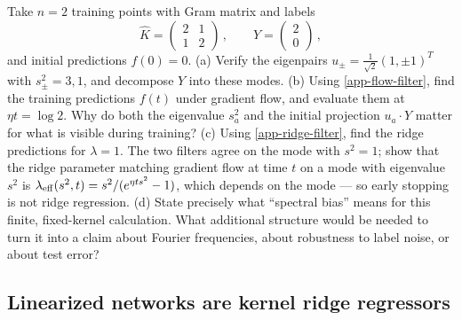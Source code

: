 \documentclass[11pt]{article}
\begin{document}
\begin{exercise}
\label{ex:app-filters}
Take $n=2$ training points with Gram matrix and labels
%
\begin{equation*}
    \hat K = \begin{pmatrix} 2 & 1 \\ 1 & 2\end{pmatrix}\,,\qquad Y = \begin{pmatrix} 2 \\ 0 \end{pmatrix}\,,
\end{equation*}
%
and initial predictions $f(0) = 0$.
(a) Verify the eigenpairs $u_\pm = \frac{1}{\sqrt2}(1,\pm 1)^T$ with $s_\pm^2 = 3, 1$, and decompose $Y$ into these modes.
(b) Using \eqref{app-flow-filter}, find the training predictions $f(t)$ under gradient flow, and evaluate them at $\eta t = \log 2$. Why do both the eigenvalue $s_a^2$ and the initial projection $u_a\cdot Y$ matter for what is visible during training?
(c) Using \eqref{app-ridge-filter}, find the ridge predictions for $\lambda = 1$. The two filters agree on the mode with $s^2 = 1$; show that the ridge parameter matching gradient flow at time $t$ on a mode with eigenvalue $s^2$ is $\lambda_{\rm eff}(s^2,t) = s^2/(e^{\eta t s^2}-1)$, which depends on the mode --- so early stopping is not ridge regression.
(d) State precisely what ``spectral bias'' means for this finite, fixed-kernel calculation. What additional structure would be needed to turn it into a claim about Fourier frequencies, about robustness to label noise, or about test error?
\end{exercise}

\subsection{Linearized networks are kernel ridge regressors}
\label{app:linearized}
\end{document}
